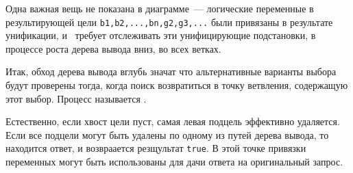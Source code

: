 
Одна важная вещь не показана в диаграмме\ --- логические переменные в
результирующей цели \verb|b1,b2,...,bn,g2,g3,...| были привязаны в результате
унификации, и \prolog\ требует отслеживать эти унифицирующие подстановки, в
процессе роста дерева вывода вниз, во всех ветках.

Итак, обход дерева вывода вглубь значат что альтернативные варианты выбора будут
проверены тогда, когда поиск возвратиться в точку ветвления, содержащую этот
выбор. Процесс называется .

Естественно, если хвост цели пуст, самая левая подцель 
эффективно удаляется. Если все подцели могут быть удалены по одному из путей
дерева вывода, то находится ответ, и возвраается резщультат \verb|true|. В этой
точке привязки переменных могут быть использованы для дачи ответа на
оригинальный запрос.

